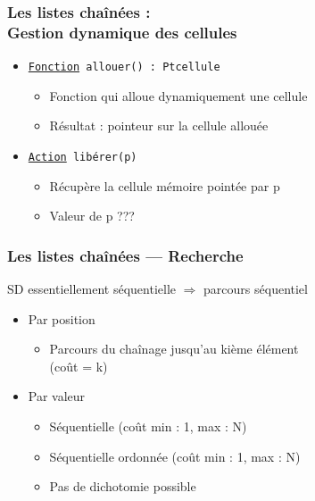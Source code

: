 \documentclass[table,handout,tikz,12pt,svgnames]{beamer}
\begin{document}
\begin{frame}[fragile=singleslide]
	\frametitle{Les listes chaînées :\\ Gestion dynamique des cellules}
	\begin{block}{} %
		\begin{itemize}
			\item \texttt{\underline{Fonction} allouer() : Ptcellule}
			\begin{itemize}
				\item Fonction qui alloue dynamiquement une cellule 
				\item Résultat : pointeur sur la cellule allouée
			\end{itemize}
			\item \texttt{\underline{Action} libérer(p)}
			\begin{itemize}
				\item Récupère la cellule mémoire pointée par p
				\item Valeur de p ???
			\end{itemize}
		\end{itemize}
	\end{block}
\end{frame}


\begin{frame}[fragile=singleslide]
	\frametitle{Les listes chaînées --- Recherche}
	\begin{block}{SD essentiellement séquentielle $\Rightarrow$ parcours séquentiel} %
		\begin{itemize}
			\item Par position
			\begin{itemize}
				\item Parcours du chaînage jusqu'au kième élément \\
                (coût = k)
			\end{itemize}
			\item Par valeur
			\begin{itemize}
				\item Séquentielle (coût min : 1, max : N)
				\item Séquentielle ordonnée (coût min : 1, max : N)
				\item Pas de dichotomie possible
			\end{itemize}
		\end{itemize}
	\end{block}
\end{frame}
\end{document}
